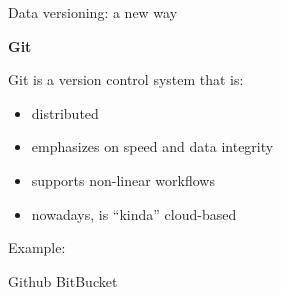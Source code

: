 \documentclass{beamer}
\begin{document}
\begin{frame}{Data versioning: a new way}

  {\Large \textbf {Git}}
  
  Git is a version control system that is:
  
  \begin{itemize}
  
    \item distributed
    \item emphasizes on speed and data integrity
    \item supports non-linear workflows
    \item nowadays, is ``kinda'' cloud-based
  
  \end{itemize}
  
  Example:

    Github
    BitBucket
    
\end{frame}
\end{document}

